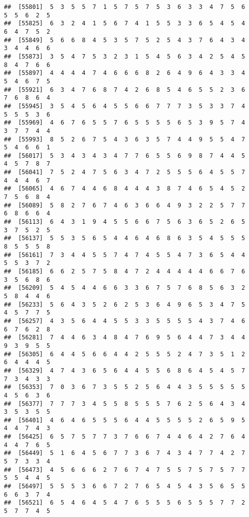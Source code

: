 \documentclass[
]{book}
\begin{document}
\begin{verbatim}
##  [55801]  5  3  5  5  7  1  5  7  5  7  5  3  6  3  3  4  7  5  6  5  5  6  2  5
##  [55825]  6  3  2  4  1  5  6  7  4  1  5  5  3  3  6  5  4  5  4  6  4  7  5  2
##  [55849]  5  6  6  8  4  5  3  5  7  5  2  5  4  3  7  6  4  3  4  3  4  4  6  6
##  [55873]  3  5  4  7  5  3  2  3  1  5  4  5  6  3  4  2  5  4  5  8  4  7  6  6
##  [55897]  4  4  4  4  7  4  6  6  6  8  2  6  4  9  6  4  3  3  4  5  4  6  7  5
##  [55921]  6  3  4  7  6  8  7  4  2  6  8  5  4  6  5  5  2  3  6  7  6  8  6  4
##  [55945]  3  5  4  5  6  4  5  5  6  6  7  7  7  3  5  3  3  7  4  5  5  5  3  6
##  [55969]  4  6  7  6  5  5  7  6  5  5  5  5  6  5  3  9  5  7  4  3  7  7  4  4
##  [55993]  8  5  2  6  7  5  4  3  6  3  5  7  4  4  9  5  5  4  7  5  4  6  6  1
##  [56017]  5  3  4  3  4  3  4  7  7  6  5  5  6  9  8  7  4  4  5  4  5  7  8  7
##  [56041]  7  5  2  4  7  5  6  3  4  7  2  5  5  5  6  4  5  5  7  4  4  4  6  7
##  [56065]  4  6  7  4  4  6  8  4  4  4  3  8  7  4  6  5  4  5  2  7  5  6  8  4
##  [56089]  5  8  2  7  6  7  4  6  3  6  6  4  9  3  2  2  5  7  7  6  8  6  6  4
##  [56113]  6  4  3  1  9  4  5  5  6  6  7  5  6  3  6  5  2  6  5  3  7  5  2  5
##  [56137]  5  5  3  5  6  5  4  4  6  4  6  8  6  3  5  4  5  5  5  8  5  5  5  8
##  [56161]  7  3  4  4  5  5  7  4  7  4  5  5  4  7  3  6  5  4  4  5  5  3  7  2
##  [56185]  6  6  2  5  7  5  8  4  7  2  4  4  4  4  4  6  6  7  6  3  5  6  8  6
##  [56209]  5  4  5  4  4  6  6  3  3  6  7  5  7  6  8  5  6  3  2  5  8  4  4  6
##  [56233]  5  6  4  3  5  2  6  2  5  3  6  4  9  6  5  3  4  7  5  4  5  7  7  5
##  [56257]  4  3  5  6  4  4  5  5  3  3  5  5  5  5  4  3  7  4  6  6  7  6  2  8
##  [56281]  7  4  4  6  3  4  8  4  7  6  9  5  6  4  4  7  3  4  4  9  3  9  5  5
##  [56305]  6  4  4  5  6  6  4  4  2  5  5  5  2  4  7  3  5  1  2  6  4  4  4  5
##  [56329]  4  7  4  3  6  5  6  4  4  5  5  6  8  6  4  5  4  5  7  7  3  4  3  3
##  [56353]  7  0  3  6  7  3  5  5  2  5  6  4  4  3  5  5  5  5  5  4  5  6  3  6
##  [56377]  7  7  7  3  4  5  5  8  5  5  5  7  6  2  5  6  4  3  4  3  5  3  5  5
##  [56401]  4  6  4  6  5  5  5  6  4  4  5  5  5  5  2  6  5  9  5  4  4  7  4  3
##  [56425]  6  5  7  5  7  7  3  7  6  6  7  4  4  6  4  2  7  6  4  4  4  7  6  5
##  [56449]  5  1  6  4  5  6  7  7  3  6  7  4  3  4  7  7  4  2  7  5  7  3  3  4
##  [56473]  4  5  6  6  6  2  7  6  7  4  7  5  5  7  5  7  5  7  7  5  5  4  4  5
##  [56497]  5  5  5  3  6  6  7  2  7  6  5  4  5  4  3  5  6  5  5  6  6  3  7  4
##  [56521]  6  5  4  6  4  5  4  7  6  5  5  5  6  5  5  5  7  7  2  5  7  7  4  5

\end{verbatim}
\end{document}
